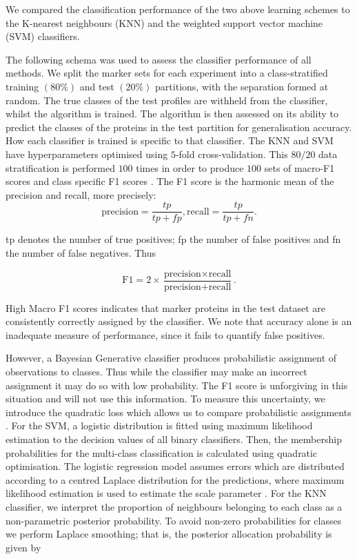 \documentclass[12pt,english]{article}\usepackage[]{graphicx}\usepackage[]{color}
\begin{document}
We compared the classification performance of the two
above learning schemes to the K-nearest neighbours (KNN) and the
weighted support vector machine (SVM) classifiers.

The following schema was used to assess the classifier performance of
all methods. We split the marker sets for each experiment into a
class-stratified training $(80\%)$ and test $(20\%)$ partitions, with
the separation formed at random. The true classes of the test profiles
are withheld from the classifier, whilst the algorithm is trained. The
algorithm is then assessed on its ability to predict the classes of
the proteins in the test partition for generalisation accuracy. How
each classifier is trained is specific to that classifier.  The KNN
and SVM have hyperparameters optimised using $5$-fold
cross-validation. This $80/20$ data stratification is performed $100$
times in order to produce $100$ sets of macro-F1 \citep{He::2009}
scores and class specific F1 scores \citep{Breckels:2016}. The F1
score is the harmonic mean of the precision and recall, more
precisely:
\[\text{precision}=\frac{tp}{tp+fp}, \text{recall} = \frac{tp}{tp+fn}.\]

tp denotes the number of true positives; fp the number of
false positives and fn the number of false negatives. Thus

\[\text{F1}=2\times\frac{\text{precision}\times\text{recall}}{\text{precision}+\text{recall}}.\]

High Macro F1 scores indicates that marker proteins in the test
dataset are consistently correctly assigned by the classifier. We note
that accuracy alone is an inadequate measure of performance, since it
fails to quantify false positives.

However, a Bayesian Generative classifier produces probabilistic
assignment of observations to classes. Thus while the classifier may
make an incorrect assignment it may do so with low probability. The F1
score is unforgiving in this situation and will not use this
information.  To measure this uncertainty, we introduce the quadratic
loss which allows us to compare probabilistic assignments
\citep{Gneiting:2007}.  For the SVM, a logistic distribution is fitted
using maximum likelihood estimation to the decision values of all
binary classifiers. Then, the membership probabilities for the
multi-class classification is calculated using quadratic optimisation.
The logistic regression model assumes errors which are distributed
according to a centred Laplace distribution for the predictions, where
maximum likelihood estimation is used to estimate the scale parameter
\citep{Meyer:2017}.  For the KNN classifier, we interpret the
proportion of neighbours belonging to each class as a non-parametric
posterior probability. To avoid non-zero probabilities for classes we
perform Laplace smoothing; that is, the posterior allocation
probability is given by
\end{document}

